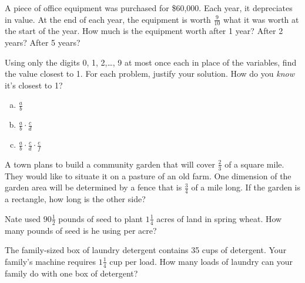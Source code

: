  \begin{problem}[Depreciation]
A piece of office equipment was purchased for \$60,000.  Each year, it depreciates in value.  At the end of each year, the equipment is worth $ \frac{9} {10} $ what it was worth at the start of the year.
How much is the equipment worth after 1 year?  After 2 years?  After 5 years?
\end{problem}

 
\begin{problem}
Using only the digits 0, 1, 2,\dots , 9 at most once each in place of the variables, find the value closest to 1.  For each problem, justify your solution.  How do you \emph{know} it's closest to 1?
\begin{enumerate}[(a)]
\item
$\displaystyle \frac a b$\\

\item
$\displaystyle \frac a b \cdot \frac c d$\\

\item
$\displaystyle \frac a b \cdot \frac c d \cdot \frac e f$\\

\end{enumerate}

\end{problem}





 \begin{problem}
A town plans to build a community garden that will cover $\frac 2 3$ of a square mile. They would like to situate it on a pasture of an old  farm. One dimension of the garden area will be determined by a fence that is $\frac 3 4$ of a mile long. If the garden is a rectangle, how long is the other side?


\end{problem}






 \begin{problem}
Nate used $90 \frac 1 2$ pounds of seed to plant $1 \frac 1 4$ acres of land in spring wheat.  How many pounds of seed is he using per acre?
\end{problem}

 

\begin{problem}
The family-sized box of laundry detergent contains 35 cups of detergent.  Your family's  machine requires  $1 \frac 1 4$ cup per load.  How many loads of laundry can your family do with one box of detergent?
\end{problem}




